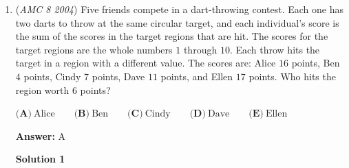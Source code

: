 \begin{enumerate}
 $a+b +c = 3$,

 
Case $1:a=0$,

 $b+c = 3$,

 $b = 0,1,2,3$ ,

 $c = 3,2,1,0$,

 $\boxed{\textbf\ 4}$ solutions.

 
Case $2:a=1$,

 $1 + b + c = 3$,

 $b + c = 2$,

 $b = 0,1,2$ ,

 $c = 2,1,0$ ,

 $\boxed{\textbf\ 3}$ solutions.

 
Case $3:a= 2$,

 $2 + b + c = 3$,

 $b + c = 1$,

 $b = 0,1$,

 $c = 1,0$,

 $\boxed{\textbf\ 2}$ solutions.

 
Case $4:a = 3$,

 $3+b+c = 3$,

 $b+c = 0$,

 $b = 0$,

 $c = 0$,

 $\boxed{\textbf\ 1}$ solution.

 Therefore there will be a total of $4+3+2+1=\boxed{\textbf{(D)}\ 10}$ solutions.Solution by \href{https://artofproblemsolving.com/wiki/index.php?title=User:Phoenixfire}{phoenixfire}

 


	\item (\textit{AMC 8 2004}) Five friends compete in a dart-throwing contest. Each one has two darts to throw at the same circular target, and each individual's score is the sum of the scores in the target regions that are hit. The scores for the target regions are the whole numbers $1$ through $10$. Each throw hits the target in a region with a different value. The scores are: Alice $16$ points, Ben $4$ points, Cindy $7$ points, Dave $11$ points, and Ellen $17$ points. Who hits the region worth $6$ points?


 $\textbf{(A)}\ \text{Alice}\qquad \textbf{(B)}\ \text{Ben}\qquad \textbf{(C)}\ \text{Cindy}\qquad \textbf{(D)}\ \text{Dave} \qquad \textbf{(E)}\ \text{Ellen}$

 \textbf{Answer: }A



\textbf{Solution 1}


\end{enumerate}
